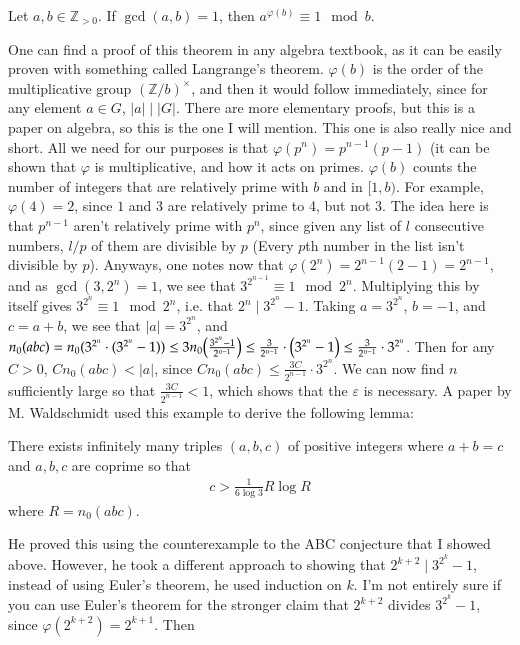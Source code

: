 \documentclass[12pt]{article}
\newenvironment{theorem}{\begin{mytheorem}}{\end{mytheorem}}
\newenvironment{lemma}{\begin{mylemma}}{\end{mylemma}}
\theoremstyle{definitionstyle}
\def\mbb#1{\mathbb{#1}}
\def\bZ{\mbb{Z}}
\def \ve{\varepsilon}
\begin{document}
\begin{theorem}[Euler]
	Let $a, b \in \bZ_{>0}$. If $\gcd(a, b) = 1$, then $a^{\varphi(b)} \equiv 1 \mod b$.
\end{theorem}
 One can find a proof of this theorem in any algebra textbook, as it can be easily proven with something called Langrange's theorem. $\varphi(b)$ is the order of the multiplicative group $(\bZ/b)^\times$, and then it would follow immediately, since for any element $a \in G$, $|a| \mid |G|$. There are more elementary proofs, but this is a paper on algebra, so this is the one I will mention. This one is also really nice and short. All we need for our purposes is that $\varphi(p^n) = p^{n-1}(p-1)$ (it can be shown that $\varphi$ is multiplicative, and how it acts on primes. $\varphi(b)$ counts the number of integers that are relatively prime with $b$ and in $[1, b)$. For example, $\varphi(4) = 2$, since $1$ and $3$ are relatively prime to 4, but not 3. The idea here is that $p^{n-1}$ aren't relatively prime with $p^n$, since given any list of $l$ consecutive numbers, $l/p$ of them are divisible by $p$ (Every $p$th number in the list isn't divisible by $p$). Anyways, one notes now that $\varphi(2^n) = 2^{n-1}(2-1) = 2^{n-1}$, and as $\gcd(3, 2^n) = 1$, we see that $3^{2^{n-1}} \equiv 1 \mod 2^n$. Multiplying this by itself gives $3^{2^n} \equiv 1 \mod 2^n$, i.e. that $2^n \mid 3^{2^n} - 1$. Taking $a = 3^{2^n}$, $b=-1$, and $c = a + b$, we see that $|a| = 3^{2^n}$, and $n_0(abc) = n_0(3^{2^n} \cdot (3^{2^n}-1)) \leq 3n_0\qty(\frac{3^{2^n}-1}{2^{n-1}}) \leq \frac3{2^{n-1}} \cdot \qty(3^{2^n}-1) \leq \frac3{2^{n-1}} \cdot 3^{2^n}$. Then for any $C > 0$, $Cn_0(abc) < |a|$, since $Cn_0(abc) \leq \frac{3C}{2^{n-1}} \cdot 3^{2^n}$. We can now find $n$ sufficiently large so that $\frac{3C}{2^{n-1}} < 1$, which shows that the $\ve$ is necessary. A paper by M. Waldschmidt \cite{Waldschmidt2015LectureOT} used this example to derive the following lemma:
 \begin{lemma}
 	There exists infinitely many triples $(a, b, c)$ of positive integers where $a + b = c$ and $a, b, c$ are coprime so that 
 	\begin{align*}
 		c > \frac1{6\log3} R\log R
 	\end{align*}
 	where $R = n_0(abc)$.
 \end{lemma}
He proved this using the counterexample to the ABC conjecture that I showed above. However, he took a different approach to showing that $2^{k+2} \mid 3^{2^k} - 1$, instead of using Euler's theorem, he used induction on $k$. I'm not entirely sure if you can use Euler's theorem for the stronger claim that $2^{k+2}$ divides $3^{2^k} - 1$, since $\varphi(2^{k+2}) = 2^{k+1}$. Then 
\end{document}
